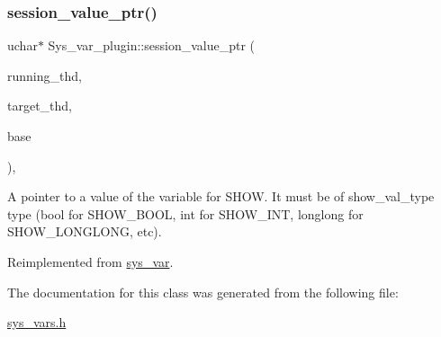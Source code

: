 \subsubsection{\texorpdfstring{session\+\_\+value\+\_\+ptr()}{session\_value\_ptr()}}
{\footnotesize\ttfamily uchar$\ast$ Sys\+\_\+var\+\_\+plugin\+::session\+\_\+value\+\_\+ptr (\begin{DoxyParamCaption}\item[{T\+HD $\ast$}]{running\+\_\+thd,  }\item[{T\+HD $\ast$}]{target\+\_\+thd,  }\item[{L\+E\+X\+\_\+\+S\+T\+R\+I\+NG $\ast$}]{base }\end{DoxyParamCaption})\hspace{0.3cm}{\ttfamily [inline]}, {\ttfamily [virtual]}}

A pointer to a value of the variable for S\+H\+OW. It must be of show\+\_\+val\+\_\+type type (bool for S\+H\+O\+W\+\_\+\+B\+O\+OL, int for S\+H\+O\+W\+\_\+\+I\+NT, longlong for S\+H\+O\+W\+\_\+\+L\+O\+N\+G\+L\+O\+NG, etc). 

Reimplemented from \mbox{\hyperlink{classsys__var_a3e511591aaf555d2bc2ce40a80b7e899}{sys\+\_\+var}}.



The documentation for this class was generated from the following file\+:\begin{DoxyCompactItemize}
\item 
\mbox{\hyperlink{sys__vars_8h}{sys\+\_\+vars.\+h}}\end{DoxyCompactItemize}

